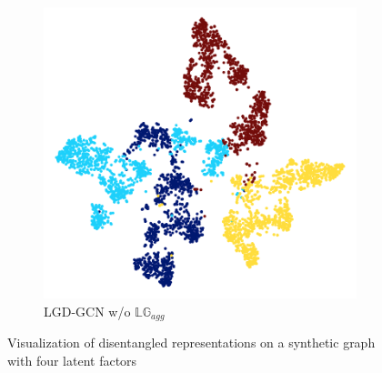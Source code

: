 \documentclass[accepted]{uai2021} %
\begin{document}
\begin{table}[t]
\centering
\setlength{\abovecaptionskip}{2pt}\makeatletter{}\makeatother
\caption{Parameters for generating synthetic datasets}\label{tab:syndata_sta}
\end{table}

\begin{figure}[ht]
    \captionsetup[subfigure]{labelformat=empty}
    \centering
    \begin{subfigure}[b]{0.28\textwidth}
        \centering
        \includegraphics[width=.85\textwidth]{nglgd_not_bad.png}
        \caption{LGD-GCN w/o $\mathbb{LG}_{agg}$}
    \end{subfigure}
    \caption{Visualization of disentangled representations on a synthetic graph with four latent factors}\label{fig:nglgd_not_bad}
\end{figure}
\end{document}
